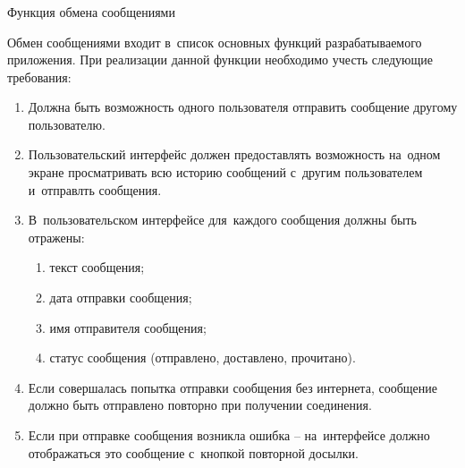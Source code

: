 \subsubsection{} Функция обмена сообщениями
\label{sec:analysis:research:funcreq:messages}

Обмен сообщениями входит в~список основных функций разрабатываемого приложения. При реализации данной функции необходимо учесть следующие требования:

\begin{enumerate}
	\item Должна быть возможность одного пользователя отправить сообщение другому пользователю.
	\item Пользовательский интерфейс должен предоставлять возможность на~одном экране просматривать всю историю сообщений с~другим пользователем и~отправлть сообщения.
	\item В~пользовательском интерфейсе для~каждого сообщения должны быть отражены:
	\begin{enumerate}
		\item текст сообщения;
		\item дата отправки сообщения;
		\item имя отправителя сообщения;
		\item статус сообщения (отправлено, доставлено, прочитано).
	\end{enumerate}
	\item Если совершалась попытка отправки сообщения без интернета, сообщение должно быть отправлено повторно при получении соединения.
	\item Если при отправке сообщения возникла ошибка -- на~интерфейсе должно отображаться это сообщение с~кнопкой повторной досылки.
\end{enumerate}
